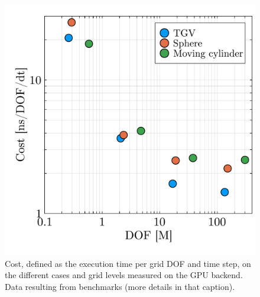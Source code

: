 \documentclass[10pt,a4paper]{article}
\begin{document}
\begin{figure}[!t]
  \centering
  \includegraphics[width=0.4\linewidth]{img/cost.pdf}
  \vspace*{-0.3cm}
  \caption{Cost, defined as the execution time per grid DOF and time step, on the different cases and grid levels measured on the GPU backend. Data resulting from  benchmarks (more details in that caption).}
\label{fig:cost}
\end{figure}
\end{document}
